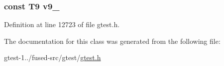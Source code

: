\hypertarget{classtesting_1_1internal_1_1ValueArray43_a6356e16cf54a9dfac8525f20242af31e}{
\subsubsection[{v9\-\_\-}]{\setlength{\rightskip}{0pt plus 5cm}const \-T9 {\bf v9\-\_\-}}}\label{d3/d15/classtesting_1_1internal_1_1ValueArray43_a6356e16cf54a9dfac8525f20242af31e}


\-Definition at line 12723 of file gtest.\-h.



\-The documentation for this class was generated from the following file\-:\begin{DoxyCompactItemize}
\item 
gtest-\/1../fused-\/src/gtest/\hyperlink{fused-src_2gtest_2gtest_8h}{gtest.\-h}\end{DoxyCompactItemize}
